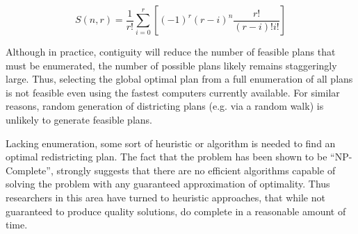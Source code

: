 \documentclass[article]{JSSstyle/jss}
\begin{document}
\[
S\left( {n,r} \right) = \frac{1}{{r!}}\sum\limits_{i = 0}^r {\left[ {\left( { - 1} \right)^r \left( {r - i} \right)^n \frac{{r!}}{{\left( {r - i} \right)!i!}}} \right]} 
\]

Although in practice, contiguity will 
reduce the number of feasible plans that must be enumerated, the number 
of possible plans likely remains staggeringly large.  Thus, 
selecting the global optimal plan from a full enumeration of all 
plans is not feasible even using the fastest computers currently available. For similar reasons, random generation of districting plans (e.g. via a random walk) is unlikely to generate feasible plans. 

Lacking enumeration, some sort of heuristic or algorithm is needed to find an 
optimal redistricting plan. The fact that the problem has been shown to be ``NP-Complete'', strongly suggests that there are no efficient algorithms capable of solving the problem with any guaranteed approximation of optimality. Thus researchers in this area have turned to heuristic approaches, that while not guaranteed to produce quality solutions, do complete in a reasonable amount of time. 
\end{document}
